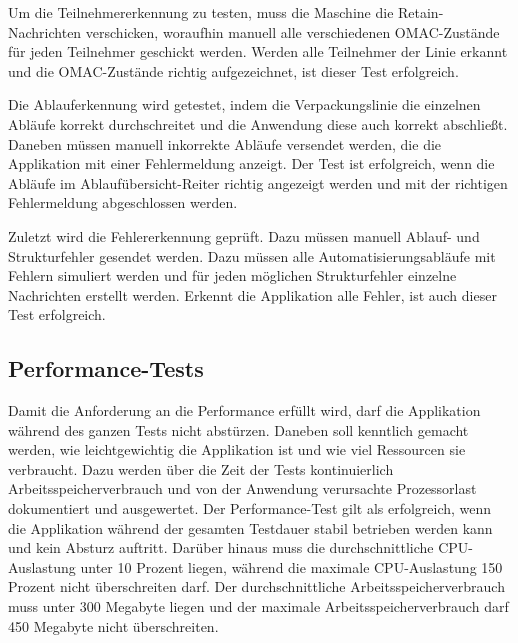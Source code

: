  Um die Teilnehmererkennung zu testen, muss die Maschine die Retain-Nachrichten verschicken, woraufhin manuell alle verschiedenen OMAC-Zustände für jeden Teilnehmer geschickt werden. Werden alle Teilnehmer der Linie erkannt und die OMAC-Zustände richtig aufgezeichnet, ist dieser Test erfolgreich.
 
 Die Ablauferkennung wird getestet, indem die Verpackungslinie die einzelnen Abläufe korrekt durchschreitet und die Anwendung diese auch korrekt abschließt. Daneben müssen manuell inkorrekte Abläufe versendet werden, die die Applikation mit einer Fehlermeldung anzeigt. Der Test ist erfolgreich, wenn die Abläufe im Ablaufübersicht-Reiter richtig angezeigt werden und mit der richtigen Fehlermeldung abgeschlossen werden.
 
 Zuletzt wird die Fehlererkennung geprüft. Dazu müssen manuell Ablauf- und Strukturfehler gesendet werden. Dazu müssen alle Automatisierungsabläufe mit Fehlern simuliert werden und für jeden möglichen Strukturfehler einzelne Nachrichten erstellt werden. Erkennt die Applikation alle Fehler, ist auch dieser Test erfolgreich.
 
 \subsection{Performance-Tests}
 Damit die Anforderung an die Performance erfüllt wird, darf die Applikation während des ganzen Tests nicht abstürzen. Daneben soll kenntlich gemacht werden, wie leichtgewichtig die Applikation ist und wie viel Ressourcen sie verbraucht. Dazu werden über die Zeit der Tests kontinuierlich Arbeitsspeicherverbrauch und von der Anwendung verursachte Prozessorlast dokumentiert und ausgewertet. Der Performance-Test gilt als erfolgreich, wenn die Applikation während der gesamten Testdauer stabil betrieben werden kann und kein Absturz auftritt. Darüber hinaus muss die durchschnittliche CPU-Auslastung unter 10 Prozent liegen, während die maximale CPU-Auslastung 150 Prozent nicht überschreiten darf. Der durchschnittliche Arbeitsspeicherverbrauch muss unter 300 Megabyte liegen und der maximale Arbeitsspeicherverbrauch darf 450 Megabyte nicht überschreiten.
 
